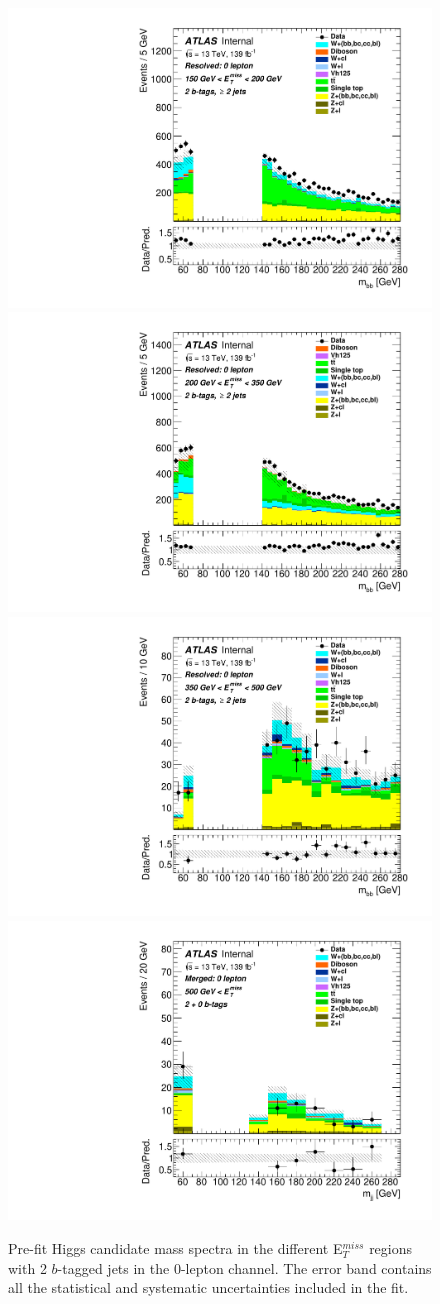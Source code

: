 \begin{figure}[!htb]
  \includegraphics[width=0.46\linewidth]{chapters/c9/figures/Region_distmBB_J2_L0_T2_DSR_Y2015_incJet1_Fat0_incFat1_BMin150_BMax200_Prefit.pdf}
  \includegraphics[width=0.46\linewidth]{chapters/c9/figures/Region_distmBB_J2_L0_T2_DSR_Y2015_incJet1_Fat0_incFat1_BMin200_BMax350_Prefit.pdf}\\
  \includegraphics[width=0.46\linewidth]{chapters/c9/figures/Region_distmBB_J2_L0_T2_DSR_Y2015_incJet1_Fat0_incFat1_BMin350_BMax500_Prefit.pdf}
  \includegraphics[width=0.46\linewidth]{chapters/c9/figures/Region_BMin500_incFat1_Fat1_incJet1_Y2015_DSR_T20_L0_distmBB_J0_Prefit.pdf}
\caption{Pre-fit Higgs candidate mass spectra in the different E$_{T}^{miss}$ regions with 2 $b$-tagged jets in the 0-lepton channel. The error band contains all the statistical and systematic uncertainties included in the fit.}
\label{fig:Data_MC_SR_m_jj_2b}
\end{figure}



